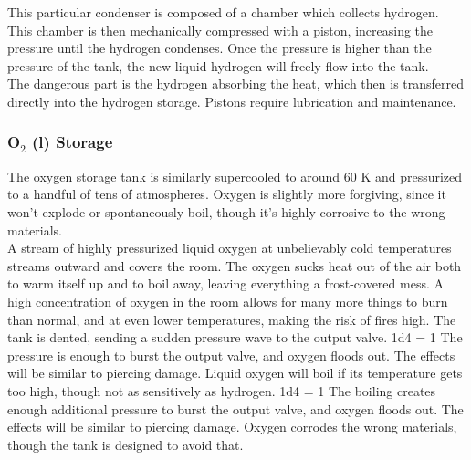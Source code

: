 \documentclass[a4paper]{article}
\begin{document}
This particular condenser is composed of a chamber which collects hydrogen. This chamber is then mechanically compressed with a piston, increasing the pressure until the hydrogen condenses. Once the pressure is higher than the pressure of the tank, the new liquid hydrogen will freely flow into the tank.
\\ \pbhw
{}
{}
{The dangerous part is the hydrogen absorbing the heat, which then is transferred directly into the hydrogen storage.}
{Pistons require lubrication and maintenance.}


\vspace{-0.5cm} \hspace{-18pt} \subsubsection{O$_2$ (l) Storage} \label{engine_o2_storage} \vspace{-0.2cm}
The oxygen storage tank is similarly supercooled to around 60 K and pressurized to a handful of tens of atmospheres. Oxygen is slightly more forgiving, since it won't explode or spontaneously boil, though it's highly corrosive to the wrong materials.
\\ \pbhw
{A stream of highly pressurized liquid oxygen at unbelievably cold temperatures streams outward and covers the room. The oxygen sucks heat out of the air both to warm itself up and to boil away, leaving everything a frost-covered mess. A high concentration of oxygen in the room allows for many more things to burn than normal, and at even lower temperatures, making the risk of fires high.}
{The tank is dented, sending a sudden pressure wave to the output valve. \newline 1d4 = 1 The pressure is enough to burst the output valve, and oxygen floods out. The effects will be similar to piercing damage.}
{Liquid oxygen will boil if its temperature gets too high, though not as sensitively as hydrogen. \newline 1d4 = 1 The boiling creates enough additional pressure to burst the output valve, and oxygen floods out. The effects will be similar to piercing damage.}
{Oxygen corrodes the wrong materials, though the tank is designed to avoid that. }
\end{document}
